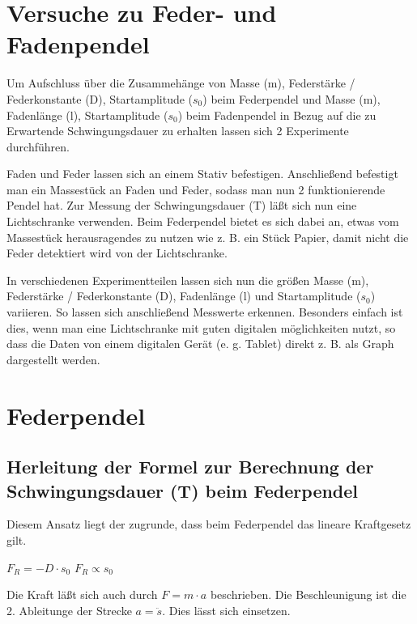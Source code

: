 \documentclass{article}
\begin{document}

\section*{Versuche zu Feder- und Fadenpendel}

Um Aufschluss über die Zusammehänge von Masse (m), Federstärke / Federkonstante (D),
Startamplitude ($s_0$) beim Federpendel und Masse (m), Fadenlänge (l),
Startamplitude ($s_0$) beim Fadenpendel in Bezug auf die zu Erwartende
Schwingungsdauer zu erhalten lassen sich 2 Experimente durchführen.

Faden und Feder lassen sich an einem Stativ befestigen. Anschließend befestigt man ein
Massestück an Faden und Feder, sodass man nun 2 funktionierende Pendel hat.
Zur Messung der Schwingungsdauer (T) läßt sich nun eine Lichtschranke verwenden.
Beim Federpendel bietet es sich dabei an, etwas vom Massestück herausragendes zu nutzen
wie z. B. ein Stück Papier, damit nicht die Feder detektiert wird von der Lichtschranke.

In verschiedenen Experimentteilen lassen sich nun die größen Masse (m),
Federstärke / Federkonstante (D), Fadenlänge (l) und Startamplitude ($s_0$) variieren.
So lassen sich anschließend Messwerte erkennen. Besonders einfach ist dies, wenn man
eine Lichtschranke mit guten digitalen möglichkeiten nutzt, so dass die Daten von einem
digitalen Gerät (e. g. Tablet) direkt z. B. als Graph dargestellt werden.

\clearpage

\section*{Federpendel}

\subsection*{Herleitung der Formel zur Berechnung der Schwingungsdauer (T) beim Federpendel}

Diesem Ansatz liegt der zugrunde, dass beim Federpendel das lineare Kraftgesetz gilt.

\large
$F_R = -D \cdot s_0$
\hspace*{1cm}$F_R \propto s_0$
\vspace{0.5cm}

\normalsize
Die Kraft läßt sich auch durch $F = m \cdot a$ beschrieben.
Die Beschleunigung ist die 2. Ableitunge der Strecke $a = \ddot{s}$. Dies lässt sich
einsetzen.
\end{document}
